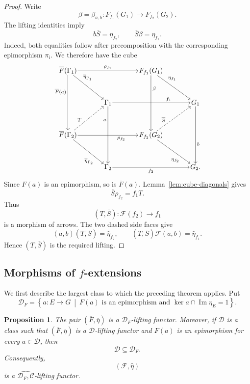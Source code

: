 \documentclass[10pt]{amsart}
\newtheorem{proposition}[theorem]{Proposition}
\renewcommand{\*}{\cdot {\dots} \cdot}
\newcommand{\?}[1]{\overset{?}{#1}}
\numberwithin{equation}{section}
\begin{document}
\begin{proof}
Write
\[
\beta=\beta_{a,b}\colon
F_{f_1}(G_1)\longrightarrow F_{f_2}(G_2).
\]
The lifting identities imply
\[
b\overline S=\eta_{f_2},
\qquad
\overline S\beta=\eta_{f_1}.
\]
Indeed, both equalities follow after precomposition with the
corresponding epimorphism $\pi_i$. We therefore have the cube
\[
\begin{tikzcd}[
  row sep=3.5em,
  column sep=3.8em,
  cells={nodes={inner sep=1pt}}
]
\overline F(\Gamma_1)
  \arrow[rr,"\rho_{f_1}"]
  \arrow[dd,"\overline F(a)"' {pos=0.30}]
  \arrow[dr,"\overline\eta_{\Gamma_1}" {pos=0.28}]
&&
F_{f_1}(G_1)
  \arrow[dd,"\beta" {pos=0.24}]
  \arrow[dr,"\eta_{f_1}" {pos=0.28}]
&
\\
&
\Gamma_1
  \arrow[rr,"f_1" {pos=0.72}]
  \arrow[dd,"a"' {pos=0.24}]
&&
G_1
  \arrow[dd,"b" {pos=0.66}]
\\
\overline F(\Gamma_2)
  \arrow[rr,"\rho_{f_2}"' {pos=0.72}]
  \arrow[dr,"\overline\eta_{\Gamma_2}"' {pos=0.72}]
  \arrow[ur,dashed,"T" {pos=0.30}]
&&
F_{f_2}(G_2)
  \arrow[dr,"\eta_{f_2}"' {pos=0.72}]
  \arrow[ur,dashed,"\overline S" {pos=0.30}]
&
\\
&
\Gamma_2
  \arrow[rr,"f_2"']
&&
G_2 .
\end{tikzcd}
\]
Since $F(a)$ is an epimorphism, so is $\overline F(a)$.
Lemma~\ref{lem:cube-diagonals} gives
\[
\overline S\rho_{f_2}=f_1T.
\]
Thus
\[
(T,\overline S)\colon\mathscr F(f_2)\longrightarrow f_1
\]
is a morphism of arrows. The two dashed side faces give
\[
(a,b)(T,\overline S)=\widehat\eta_{f_2},
\qquad
(T,\overline S)\mathscr F(a,b)=\widehat\eta_{f_1}.
\]
Hence $(T,\overline S)$ is the required lifting.
\end{proof}

\subsection{Morphisms of $f$-extensions}
We first describe the largest class to
which the preceding theorem applies. Put
\[
\mathcal D_F=
\left\{
a\colon E\longrightarrow G
\ \middle|\
F(a)\text{ is an epimorphism and }
\ker a\cap\operatorname{Im}\eta_E=1
\right\}.
\]

\begin{proposition}\label{prop:maximal-D}
The pair $(\overline F,\overline\eta)$ is a
$\mathcal D_F$-lifting functor. Moreover, if $\mathcal D$ is a
class such that $(\overline F,\overline\eta)$ is a
$\mathcal D$-lifting functor and $F(a)$ is an epimorphism for
every $a\in\mathcal D$, then
\[
\mathcal D\subseteq\mathcal D_F.
\]
Consequently,
\[
(\mathscr F,\widehat\eta)
\]
is a $\widehat{\mathcal D_F,\mathcal C}$-lifting functor.
\end{proposition}
\end{document}
